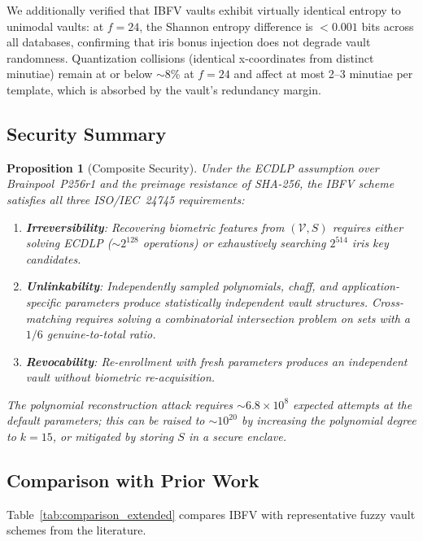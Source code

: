 \documentclass[conference]{IEEEtran}
\newtheorem{proposition}{Proposition}
\newcommand{\IBFV}{\textsf{IBFV}}
\begin{document}
We additionally verified that \IBFV{} vaults exhibit virtually identical entropy to unimodal vaults: at $f = 24$, the Shannon entropy difference is $< 0.001$ bits across all databases, confirming that iris bonus injection does not degrade vault randomness. Quantization collisions (identical x-coordinates from distinct minutiae) remain at or below $\sim$8\% at $f = 24$ and affect at most 2--3 minutiae per template, which is absorbed by the vault's redundancy margin.

\subsection{Security Summary}
\label{sec:security_summary}

\begin{proposition}[Composite Security]
Under the ECDLP assumption over Brainpool~P256r1 and the preimage resistance of SHA-256, the \IBFV{} scheme satisfies all three ISO/IEC~24745 requirements:
\begin{enumerate}
    \item \textbf{Irreversibility}: Recovering biometric features from $(\mathcal{V}, S)$ requires either solving ECDLP ($\sim\!2^{128}$ operations) or exhaustively searching $2^{514}$ iris key candidates.
    \item \textbf{Unlinkability}: Independently sampled polynomials, chaff, and application-specific parameters produce statistically independent vault structures. Cross-matching requires solving a combinatorial intersection problem on sets with a $1/6$ genuine-to-total ratio.
    \item \textbf{Revocability}: Re-enrollment with fresh parameters produces an independent vault without biometric re-acquisition.
\end{enumerate}
The polynomial reconstruction attack requires $\sim\!6.8 \times 10^{8}$ expected attempts at the default parameters; this can be raised to $\sim\!10^{20}$ by increasing the polynomial degree to $k = 15$, or mitigated by storing $S$ in a secure enclave.
\end{proposition}

\subsection{Comparison with Prior Work}
\label{sec:comparison}

Table~\ref{tab:comparison_extended} compares \IBFV{} with representative fuzzy vault schemes from the literature.
\end{document}
